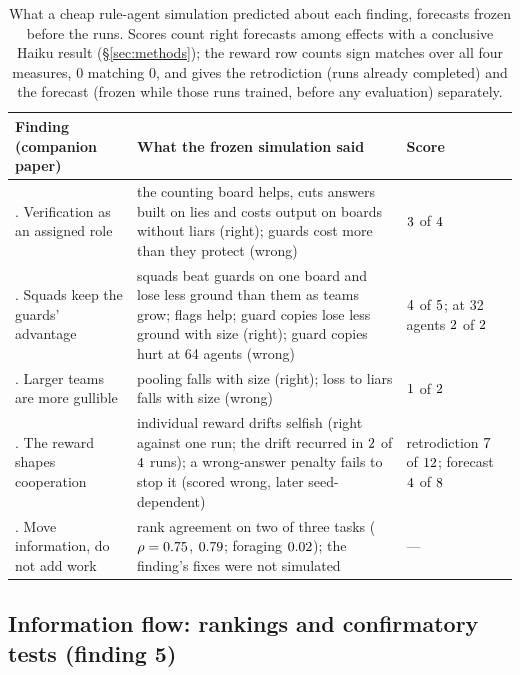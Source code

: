\documentclass{article}
\begin{document}
\begin{table}[t]
\centering
\small
\begin{tabular}{@{}>{\raggedright\arraybackslash}p{2.9cm}>{\raggedright\arraybackslash}p{7.6cm}>{\raggedright\arraybackslash}p{2.3cm}@{}}
\toprule
Finding (companion paper) & What the frozen simulation said & Score \\
\midrule
1. Verification as an assigned role & the counting board helps, cuts answers built on lies and costs output on boards without liars (right); guards cost more than they protect (wrong) & $3$ of $4$ \\
2. Squads keep the guards' advantage & squads beat guards on one board and lose less ground than them as teams grow; flags help; guard copies lose less ground with size (right); guard copies hurt at 64 agents (wrong) & $4$ of $5$; at 32 agents $2$ of $2$ \\
3. Larger teams are more gullible & pooling falls with size (right); loss to liars falls with size (wrong) & $1$ of $2$ \\
4. The reward shapes cooperation & individual reward drifts selfish (right against one run; the drift recurred in $2$ of $4$ runs); a wrong-answer penalty fails to stop it (scored wrong, later seed-dependent) & retrodiction $7$ of $12$; forecast $4$ of $8$ \\
5. Move information, do not add work & rank agreement on two of three tasks ($\rho = 0.75$, $0.79$; foraging $0.02$); the finding's fixes were not simulated & --- \\
\bottomrule
\end{tabular}
\caption{What a cheap rule-agent simulation predicted about each finding, forecasts frozen before the runs. Scores count right forecasts among effects with a conclusive Haiku result (\S\ref{sec:methods}); the reward row counts sign matches over all four measures, 0 matching 0, and gives the retrodiction (runs already completed) and the forecast (frozen while those runs trained, before any evaluation) separately.}
\label{tab:findings}
\end{table}

\subsection{Information flow: rankings and confirmatory tests (finding 5)}
\end{document}
